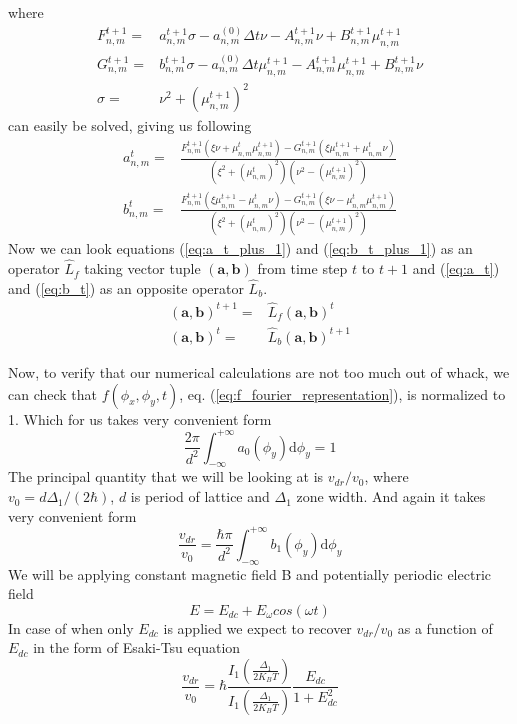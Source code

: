 \documentclass[40pt,letterpaper]{article}
\begin{document}
	where
	\begin{align}	
	 F^{t+1}_{n,m}=&a^{t+1}_{n,m}\sigma-a^{(0)}_{n,m}\Delta t\nu-A^{t+1}_{n,m}\nu+B^{t+1}_{n,m}\mu^{t+1}_{n,m} \\
	 G^{t+1}_{n,m}=&b^{t+1}_{n,m}\sigma-a^{(0)}_{n,m}\Delta t\mu^{t+1}_{n,m}-A^{t+1}_{n,m}\mu^{t+1}_{n,m}+B^{t+1}_{n,m}\nu \\
	 \sigma=&\nu^2+ \left ( \mu^{t+1}_{n,m} \right ) ^2
	\end{align}
	can easily be solved, giving us following
	\begin{align}
	 a^{t}_{n,m}=&\frac{F^{t+1}_{n,m}\left ( \xi\nu+\mu^t_{n,m}\mu^{t+1}_{n,m} \right ) -
	  G^{t+1}_{n,m} \left ( \xi\mu^{t+1}_{n,m} + \mu^t_{n,m}\nu \right ) }
	    {\left (\xi^2+ \left ( \mu^t_{n,m} \right ) ^2 \right ) \left (\nu^2-\left ( \mu^{t+1}_{n,m} \right ) ^2 \right )} \label{eq:a_t}\\
	 b^{t}_{n,m}=&\frac{F^{t+1}_{n,m}\left ( \xi\mu^{t+1}_{n,m}-\mu^t_{n,m}\nu \right ) -
	  G^{t+1}_{n,m} \left ( \xi\nu-\mu^t_{n,m}\mu^{t+1}_{n,m} \right ) }
	    {\left (\xi^2+ \left ( \mu^t_{n,m} \right ) ^2 \right ) \left (\nu^2-\left ( \mu^{t+1}_{n,m} \right ) ^2 \right )} \label{eq:b_t}
	\end{align}
	Now we can look equations (\ref{eq:a_t_plus_1}) and (\ref{eq:b_t_plus_1}) as an operator $\hat{L}_f$ taking vector
	tuple $(\mathbf{a},\mathbf{b})$ from time step $t$ to $t+1$ and (\ref{eq:a_t}) and (\ref{eq:b_t}) as an opposite operator $\hat{L}_b$.
	\begin{align}
	  (\mathbf{a},\mathbf{b})^{t+1}=&\hat{L}_f (\mathbf{a},\mathbf{b})^t \\
	  (\mathbf{a},\mathbf{b})^{t}=&\hat{L}_b (\mathbf{a},\mathbf{b})^{t+1}
	\end{align}
	

	
	Now, to verify that our numerical calculations are not too much out of whack, we can 
	check that $f(\phi_x,\phi_y,t)$, eq. (\ref{eq:f_fourier_representation}), is 
	normalized to 1. Which for us takes very convenient form 
	\begin{equation}
	\frac{2\pi}{d^2}\int^{+\infty}_{-\infty}a_0(\phi_y)\text{d}\phi_y=1
	\end{equation}
	The principal quantity that we will be looking at is $v_{dr}/v_{0}$, where $v_0=d\Delta_1/(2\hbar)$, $d$ is period of lattice and $\Delta_1$ zone width. And again it 
	takes very convenient form 
	\begin{equation}
	\frac{v_{dr}}{v_0}=\frac{\hbar\pi}{d^2}\int^{+\infty}_{-\infty}b_1(\phi_y)\text{d}\phi_y
	\end{equation}
	We will be applying constant magnetic field B and potentially periodic electric field
	\begin{equation}
	E=E_{dc}+E_{\omega}cos(\omega t)
	\end{equation}
	In case of when only $E_{dc}$ is applied we expect to recover $v_{dr}/v_0$ as a function of $E_{dc}$ in the form of Esaki-Tsu equation
	\begin{equation}
	\frac{v_{dr}}{v_0}=\hbar\frac{I_1\left(\frac{\Delta_1}{2K_BT}\right)}{I_1\left(\frac{\Delta_1}{2K_BT}\right)}\frac{E_{dc}}{1+E^2_{dc}}
	\end{equation}
\end{document}
